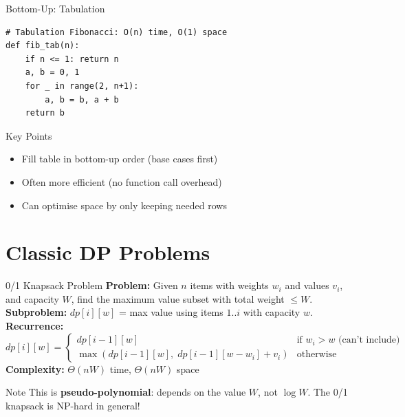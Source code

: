 \documentclass[aspectratio=169,xcolor=dvipsnames]{beamer}
\begin{document}
\begin{frame}[fragile]{Bottom-Up: Tabulation}
  \begin{lstlisting}
# Tabulation Fibonacci: O(n) time, O(1) space
def fib_tab(n):
    if n <= 1: return n
    a, b = 0, 1
    for _ in range(2, n+1):
        a, b = b, a + b
    return b
  \end{lstlisting}
  \begin{block}{Key Points}
    \begin{itemize}
      \item Fill table in bottom-up order (base cases first)
      \item Often more efficient (no function call overhead)
      \item Can optimise space by only keeping needed rows
    \end{itemize}
  \end{block}
\end{frame}

\section{Classic DP Problems}
\begin{frame}[fragile]{0/1 Knapsack Problem}
  \textbf{Problem:} Given $n$ items with weights $w_i$ and values $v_i$, and capacity $W$,
  find the maximum value subset with total weight $\le W$.\\[6pt]
  \textbf{Subproblem:} $dp[i][w]$ = max value using items $1..i$ with capacity $w$.\\[6pt]
  \textbf{Recurrence:}
  $$dp[i][w] = \begin{cases}
    dp[i-1][w] & \text{if } w_i > w \text{ (can't include)} \\
    \max(dp[i-1][w],\; dp[i-1][w-w_i]+v_i) & \text{otherwise}
  \end{cases}$$
  \textbf{Complexity:} $\Theta(nW)$ time, $\Theta(nW)$ space
  \begin{alertblock}{Note}
    This is \textbf{pseudo-polynomial}: depends on the value $W$, not $\log W$.
    The 0/1 knapsack is NP-hard in general!
  \end{alertblock}
\end{frame}
\end{document}
